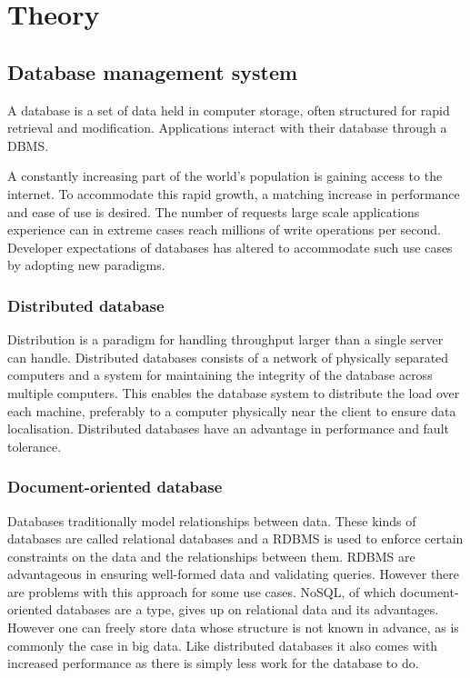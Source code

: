 \chapter{Theory}
\label{chap:theory}
\section{Database management system}

A database is a set of data held in computer storage, often structured for rapid retrieval and modification. Applications interact with their database through a \acrfull{DBMS}.

A constantly increasing part of the world's population is gaining access to the internet. To accommodate this rapid growth, a matching increase in performance and ease of use is desired. The number of requests large scale applications experience can in extreme cases reach millions of write operations per second\cite[p.~43]{nosql-ntnu}. Developer expectations of databases has altered to accommodate such use cases by adopting new paradigms. 

\subsection{Distributed database}

Distribution is a paradigm for handling throughput larger than a single server can handle. Distributed databases consists of a network of physically separated computers and a system for maintaining the integrity of the database across multiple computers\cite[p.~4]{ddms}. This enables the database system to distribute the load over each machine, preferably to a computer physically near the client to ensure data localisation. Distributed databases have an advantage in performance and fault tolerance\cite[pp.~12--15]{ddms}.

\subsection{Document-oriented database}

Databases traditionally model relationships between data. These kinds of databases are called relational databases and a \acrfull{RDBMS} is used to enforce certain constraints on the data and the relationships between them. \acrshort{RDBMS} are advantageous in ensuring well-formed data and validating queries. However there are problems with this approach for some use cases. \acrshort{NoSQL}, of which document-oriented databases are a type, gives up on relational data and its advantages. However one can freely store data whose structure is not known in advance, as is commonly the case in big data. Like distributed databases it also comes with increased performance\cite{cmp-nosql} as there is simply less work for the database to do.

